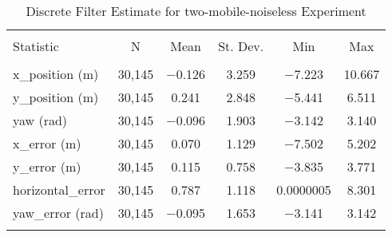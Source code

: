 
\begin{table}[h] \centering 
  \caption{Discrete Filter Estimate for two-mobile-noiseless Experiment} 
  \label{tab:two_mobile_noiseless_discrete_summary} 
\begin{tabular}{@{\extracolsep{5pt}}lccccc} 
\\[-1.8ex]\hline 
\hline \\[-1.8ex] 
Statistic & \multicolumn{1}{c}{N} & \multicolumn{1}{c}{Mean} & \multicolumn{1}{c}{St. Dev.} & \multicolumn{1}{c}{Min} & \multicolumn{1}{c}{Max} \\ 
\hline \\[-1.8ex] 
x\_position (m) & 30,145 & \num{-0.126} & \num{3.259} & \num{-7.223} & \num{10.667} \\ 
y\_position (m) & 30,145 & \num{0.241} & \num{2.848} & \num{-5.441} & \num{6.511} \\ 
yaw (rad) & 30,145 & \num{-0.096} & \num{1.903} & \num{-3.142} & \num{3.140} \\ 
x\_error (m) & 30,145 & \num{0.070} & \num{1.129} & \num{-7.502} & \num{5.202} \\ 
y\_error (m) & 30,145 & \num{0.115} & \num{0.758} & \num{-3.835} & \num{3.771} \\ 
horizontal\_error & 30,145 & \num{0.787} & \num{1.118} & \num{0.0000005} & \num{8.301} \\ 
yaw\_error (rad) & 30,145 & \num{-0.095} & \num{1.653} & \num{-3.141} & \num{3.142} \\ 
\hline \\[-1.8ex] 
\end{tabular} 
\end{table} 
